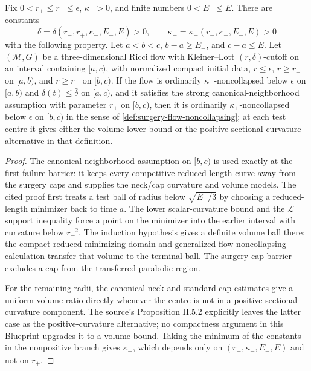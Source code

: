 \begin{lemma}
\label{lem:kleiner-lott-noncollapsing-estimate}
\notready
Fix $0<r_+\le r_-\le\epsilon$, $\kappa_->0$, and finite numbers
$0<E_-\le E$.  There are constants
\[
 \bar\delta=\bar\delta(r_-,r_+,\kappa_-,E_-,E)>0,
 \qquad
 \kappa_+=\kappa_+(r_-,\kappa_-,E_-,E)>0
\]
with the following property.  Let $a<b<c$, $b-a\ge E_-$, and
$c-a\le E$.  Let $(\mathcal M,G)$ be a three-dimensional Ricci flow with
Kleiner--Lott $(r,\delta)$-cutoff on an interval containing $[a,c)$, with
normalized compact initial data, $r\le\epsilon$, $r\ge r_-$ on $[a,b)$,
and $r\ge r_+$ on $[b,c)$.  If the flow is ordinarily
$\kappa_-$-noncollapsed below $\epsilon$ on $[a,b)$ and
$\delta(t)\le\bar\delta$ on $[a,c)$, and it satisfies the strong
canonical-neighborhood assumption with parameter $r_+$ on $[b,c)$, then it is ordinarily
$\kappa_+$-noncollapsed below $\epsilon$ on $[b,c)$ in the sense of
\ref{def:surgery-flow-noncollapsing}; at each test centre it gives either the
volume lower bound or the positive-sectional-curvature alternative in that
definition.
\end{lemma}

\begin{proof}
The canonical-neighborhood assumption on $[b,c)$ is used exactly at the
first-failure barrier: it keeps every competitive reduced-length curve away
from the surgery caps and supplies the neck/cap curvature and volume models.
The cited proof first treats a test ball of radius below
$\sqrt{E_-/3}$ by choosing a reduced-length minimizer back to time $a$.
The lower scalar-curvature bound and the $\mathcal L$ support inequality
force a point on the minimizer into the earlier interval with curvature below
$r_-^{-2}$.  The induction hypothesis gives a definite volume ball there;
the compact reduced-minimizing-domain and generalized-flow noncollapsing
calculation transfer that volume to the terminal ball.  The surgery-cap
barrier excludes a cap from the transferred parabolic region.

For the remaining radii, the canonical-neck and standard-cap estimates give a
uniform volume ratio directly whenever the centre is not in a positive
sectional-curvature component.  The source's Proposition II.5.2 explicitly
leaves the latter case as the positive-curvature alternative; no compactness
argument in this Blueprint upgrades it to a volume bound.  Taking the minimum
of the constants in the nonpositive branch gives $\kappa_+$, which depends
only on $(r_-,\kappa_-,E_-,E)$ and not on $r_+$.
\end{proof}

